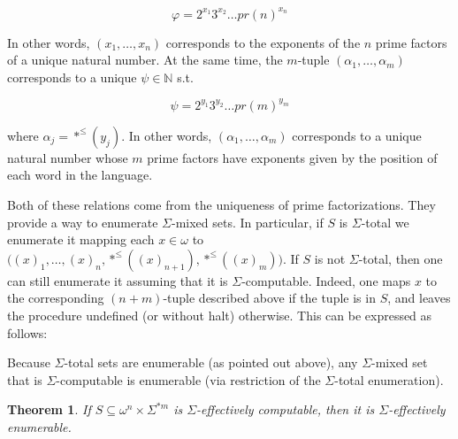 \documentclass[a4paper, 12pt]{article}
\newtheorem{theorem}{Theorem}
\newtheorem{theorem}{Theorem}
\begin{document}
$$
\varphi = 2^{x_1}3^{x_2} \ldots pr(n)^{x_n}
$$

In other words, $(x_1, \ldots, x_n)$ corresponds to the exponents of the $n$
prime factors of a unique natural number. At the same time, the $m$-tuple
$(\alpha_1, \ldots, \alpha_m)$ corresponds to a unique $\psi \in \mathbb{N}$
s.t. 

$$
\psi = 2^{y_1}3^{y_2}\ldots pr(m)^{y_m}
$$

where $\alpha_j = *^{\leq}(y_j)$. In other words, $(\alpha_1, \ldots, \alpha_m)$
corresponds to a unique natural number whose $m$ prime factors have exponents
given by the position of each word in the language.

Both of these relations come from the uniqueness of prime factorizations.
They provide a way to enumerate $\Sigma$-mixed sets. In
particular, if $S$ is $\Sigma$-total we enumerate it mapping each $x \in \omega$
to $\big((x)_1, \ldots, (x)_n, *^{\leq}((x)_{n+1}), *^{\leq}((x)_m)\big)$. If
$S$ is not $\Sigma$-total, then one can still enumerate it assuming that it is
$\Sigma$-computable. Indeed, one maps $x$ to the corresponding $(n+m)$-tuple
described above if the tuple is in $S$, and leaves the procedure undefined (or
without halt) otherwise. This can be expressed as follows:

Because $\Sigma$-total sets are enumerable (as pointed out above), any
$\Sigma$-mixed set that is $\Sigma$-computable is enumerable (via restriction
of the $\Sigma$-total enumeration).

\begin{theorem}
    If $S \subseteq \omega^{n} \times \Sigma^{*m} $ is $\Sigma$-effectively
    computable, then it is $\Sigma$-effectively enumerable.
\end{theorem}
\end{document}
